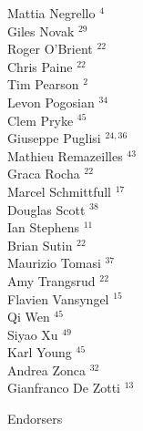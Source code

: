 \documentclass[PICOReport.tex]{subfiles}
\begin{document}
{\begin{multicols}{4}
Mattia Negrello $^{4}$                 \\
Giles Novak $^{29}$                     \\
Roger O'Brient $^{22}$                  \\
Chris Paine $^{22}$                     \\
Tim Pearson $^{2}$                     \\
Levon Pogosian $^{34}$                  \\
Clem Pryke $^{45}$                      \\
Giuseppe Puglisi $^{24, 36}$                \\
Mathieu Remazeilles $^{43}$             \\
Graca Rocha $^{22}$                     \\
Marcel Schmittfull $^{17}$              \\
Douglas Scott $^{38}$                   \\
Ian Stephens $^{11}$                    \\
Brian Sutin $^{22}$                     \\
Maurizio Tomasi $^{37}$                 \\
Amy Trangsrud $^{22}$                   \\
Flavien Vansyngel $^{15}$               \\
Qi Wen $^{45}$                          \\
Siyao Xu $^{49}$                        \\
Karl Young $^{45}$                      \\
Andrea Zonca $^{32}$                    \\
Gianfranco De Zotti $^{13}$             
\end{multicols}
}

\Large { \centerline {Endorsers}}
\end{document}
